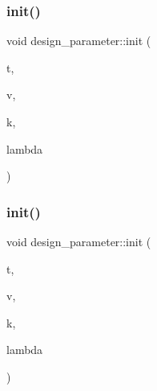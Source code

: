 \mbox{\label{classdesign__parameter_a1d2908af6f9375845123117b6cc22910}} 
\subsubsection{\texorpdfstring{init()}{init()}\hspace{0.1cm}{\footnotesize\ttfamily [2/3]}}
{\footnotesize\ttfamily void design\+\_\+parameter\+::init (\begin{DoxyParamCaption}\item[{\mbox{\hyperlink{galois_8h_a09fddde158a3a20bd2dcadb609de11dc}{I\+NT}}}]{t,  }\item[{\mbox{\hyperlink{galois_8h_a09fddde158a3a20bd2dcadb609de11dc}{I\+NT}}}]{v,  }\item[{\mbox{\hyperlink{galois_8h_a09fddde158a3a20bd2dcadb609de11dc}{I\+NT}}}]{k,  }\item[{\mbox{\hyperlink{galois_8h_a09fddde158a3a20bd2dcadb609de11dc}{I\+NT}}}]{lambda }\end{DoxyParamCaption})}

\mbox{\label{classdesign__parameter_aaa4ef79af17ce386a9887b4c3a490df4}} 
\subsubsection{\texorpdfstring{init()}{init()}\hspace{0.1cm}{\footnotesize\ttfamily [3/3]}}
{\footnotesize\ttfamily void design\+\_\+parameter\+::init (\begin{DoxyParamCaption}\item[{\mbox{\hyperlink{galois_8h_a09fddde158a3a20bd2dcadb609de11dc}{I\+NT}}}]{t,  }\item[{\mbox{\hyperlink{galois_8h_a09fddde158a3a20bd2dcadb609de11dc}{I\+NT}}}]{v,  }\item[{\mbox{\hyperlink{galois_8h_a09fddde158a3a20bd2dcadb609de11dc}{I\+NT}}}]{k,  }\item[{\mbox{\hyperlink{classdiscreta__base}{discreta\+\_\+base}} \&}]{lambda }\end{DoxyParamCaption})}

\mbox{\label{classdesign__parameter_abe95966fa2ed15d9bad7cac2476d4683}} 
